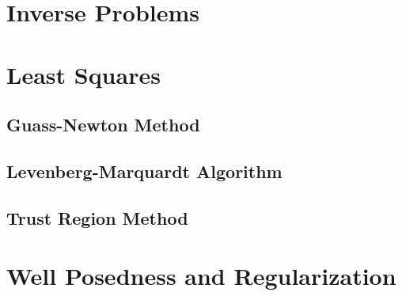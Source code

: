\section{Inverse Problems}

\citet{Tarantola2005,Tarantola1982}

\section{Least Squares}

\subsection{Guass-Newton Method}

\subsection{Levenberg-Marquardt Algorithm}

\citet{Pujol2007}

\subsection{Trust Region Method}

\citet{kelley1999iterative}

\section{Well Posedness and Regularization}

\citet{Fang2004}